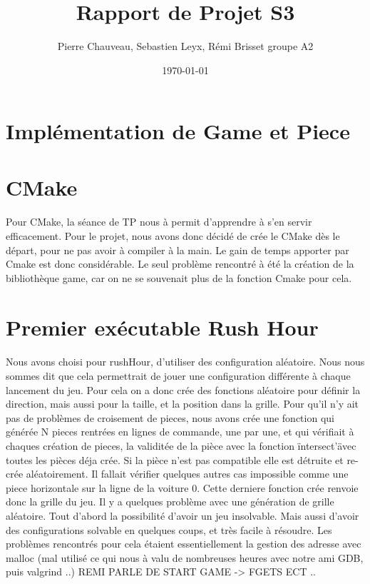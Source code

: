 \documentclass {article}
\title{Rapport de Projet S3}
\date\today
\author{Pierre Chauveau, Sebastien Leyx, Rémi Brisset groupe A2}
\begin{document}
\maketitle
\section{Implémentation de Game et Piece}
\paragraph{}

\section{CMake}
\paragraph{}
Pour CMake, la séance de TP nous à permit d'apprendre à s'en servir efficacement. Pour le projet, nous avons donc décidé de crée le CMake dès le départ, pour ne pas avoir à compiler à la main. Le gain de temps apporter par Cmake est donc considérable. Le seul problème rencontré à été la création de la bibliothèque game, car on ne se souvenait plus de la fonction Cmake pour cela. 

\section{Premier exécutable Rush Hour}
\paragraph{}
Nous avons choisi pour rushHour, d'utiliser des configuration aléatoire. Nous nous sommes dit que cela permettrait de jouer une configuration différente à chaque lancement du jeu. Pour cela on a donc crée des fonctions aléatoire pour définir la direction, mais aussi pour la taille, et la position dans la grille. Pour qu'il n'y ait pas de problèmes de croisement de pieces, nous avons crée une fonction qui générée N pieces rentrées en lignes de commande, une par une, et qui vérifiait à chaques création de pieces, la validitée de la pièce avec la fonction \"intersect'\" avec toutes les pièces déja crée. Si la pièce n'est pas compatible elle est détruite et re-crée aléatoirement. Il fallait vérifier quelques autres cas impossible comme une piece horizontale sur la ligne de la voiture 0. Cette derniere fonction crée renvoie donc la grille du jeu. Il y a quelques problème avec une génération de grille aléatoire. Tout d'abord la possibilité d'avoir un jeu insolvable. Mais aussi d'avoir des configurations solvable en quelques coups, et très facile à résoudre. Les problèmes rencontrés pour cela étaient essentiellement la gestion des adresse avec malloc (mal utilisé ce qui nous à valu de nombreuses heures avec notre ami GDB, puis valgrind ..) 
REMI PARLE DE START GAME -> FGETS ECT .. 
\end{document}
